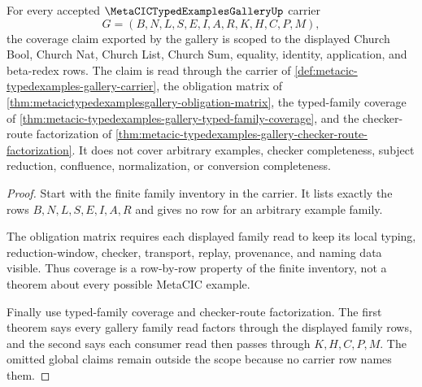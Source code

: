 \begin{theorem}
\label{thm:metacic-typed-examples-gallery-coverage-scope}
For every accepted $\MetaCICTypedExamplesGalleryUp$ carrier
$$
G=(B,N,L,S,E,I,A,R,K,H,C,P,M),
$$
the coverage claim exported by the gallery is scoped to the displayed Church Bool, Church Nat, Church List, Church Sum, equality, identity, application, and beta-redex rows. The claim is read through the carrier of \autoref{def:metacic-typedexamples-gallery-carrier}, the obligation matrix of \autoref{thm:metacictypedexamplesgallery-obligation-matrix}, the typed-family coverage of \autoref{thm:metacic-typedexamples-gallery-typed-family-coverage}, and the checker-route factorization of \autoref{thm:metacic-typedexamples-gallery-checker-route-factorization}. It does not cover arbitrary examples, checker completeness, subject reduction, confluence, normalization, or conversion completeness.
\end{theorem}
\begin{proof}
Start with the finite family inventory in the carrier. It lists exactly the rows $B,N,L,S,E,I,A,R$ and gives no row for an arbitrary example family.

The obligation matrix requires each displayed family read to keep its local typing, reduction-window, checker, transport, replay, provenance, and naming data visible. Thus coverage is a row-by-row property of the finite inventory, not a theorem about every possible MetaCIC example.

Finally use typed-family coverage and checker-route factorization. The first theorem says every gallery family read factors through the displayed family rows, and the second says each consumer read then passes through $K,H,C,P,M$. The omitted global claims remain outside the scope because no carrier row names them.
\end{proof}


